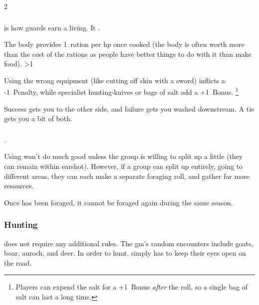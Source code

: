 \begin{multicols}{2}
\togglefalse{intro}%
\subsubsection{}
is how \glspl{guard} earn a living.
%
It .

The body provides 1~\gls{ration} per \gls{hp} once cooked
(the body is often worth more than the cost of the \glspl{ration} as people have better things to do with it than make food).
\ifnum\thetemperature>1
  \label{\jobname:harvestBasilisk}
  \label{\jobname:harvestStirge}
\else
  \label{\jobname:harvestWatcher}
  \label{\jobname:harvestGriffin}
  \label{\jobname:harvestMshrooms}
\fi
\label{\jobname:harvestBear}
\label{\jobname:harvestAuroch}
\label{\jobname:harvestDigger}

\label{harvestingEquipment}
Using the wrong \gls{equipment} (like cutting off skin with a sword) inflicts a -1~Penalty,
while specialist hunting-knives or bags of salt add a +1~Bonus.%
\footnote{Players can expend the salt for a +1~Bonus \emph{after} the roll, so a single bag of salt can last a long time.}

Success gets you to the other side, and failure gets you washed downstream.
A tie gets you a bit of both.

\subsubsection{}
%
.

Using  won't do much good unless the group is willing to split up a little (they can remain within earshot).
However, if a group can split up entirely, going to different areas, they can each make a separate foraging roll, and gather far more resources.

Once  has been foraged, it cannot be foraged again during the same season.

\subsubsection{Hunting}
does not require any additional rules.
The \gls{gm}'s random encounters include goats, boar, auroch, and deer.%
In order to hunt,  simply has to keep their eyes open on the road.


\end{multicols}
